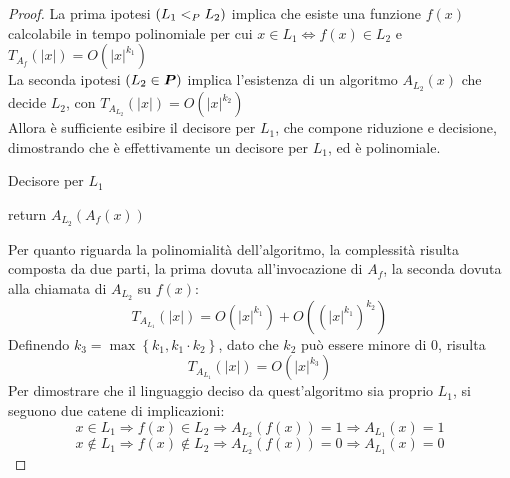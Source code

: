 \begin{proof}
    La prima ipotesi $( L_1 <_P L_2 )$ implica che esiste una funzione $f(x)$ calcolabile in tempo polinomiale per cui $x \in L_1 \Leftrightarrow f(x) \in L_2 $ e $ T_{A_{f}} (|x|) = O ( |x|^{k_1} ) $ \\
    La seconda ipotesi $ ( L_2 \in \bm{P} ) $ implica l'esistenza di un algoritmo $A_{L_{2}}(x)$ che decide $L_2$, con $ T_{A_{L_{2}}} (|x|) = O ( |x|^{k_2} ) $ \\
    Allora è sufficiente esibire il decisore per $L_1$, che compone riduzione e decisione, dimostrando che è effettivamente un decisore per $L_1$, ed è polinomiale.
\begin{algorithm}[H]
\caption{Decisore per $L_1$}\label{alg:decisorel1}
\begin{algorithmic}[1]
    \State return $A_{L_2}\left( A_{f} \left( x \right) \right)$
    \EndProcedure
\end{algorithmic}
\end{algorithm}
\noindent
    Per quanto riguarda la polinomialità dell'algoritmo, la complessità risulta composta da due parti, la prima dovuta all'invocazione di $A_f$, la seconda dovuta alla chiamata di $A_{L_2}$ su $f(x)$:
    \begin{equation*}
        T_{A_{L_{1}}}(|x|) = O \left( |x|^{k_1} \right) + O \left( \left( |x|^{k_1} \right)^{k_2} \right)
    \end{equation*}
    Definendo $k_3 = \max \left\{ k_1, k_1 \cdot k_2 \right\}$, dato che $k_2$ può essere minore di $0$, risulta
    \begin{equation*}
        T_{A_{L_{1}}}(|x|) = O \left( |x|^{k_3} \right) 
    \end{equation*}
    Per dimostrare che il linguaggio deciso da quest'algoritmo sia proprio $L_1$, si seguono due catene di implicazioni:
    \begin{equation*}
        x \in L_1 
        \Rightarrow
        f(x) \in L_2 
        \Rightarrow
        A_{L_2}\left( f(x) \right) = 1
        \Rightarrow
        A_{L_1} (x) = 1
    \end{equation*}
    \begin{equation*}
        x \notin L_1 
        \Rightarrow
        f(x) \notin L_2 
        \Rightarrow
        A_{L_2}\left( f(x) \right) = 0
        \Rightarrow
        A_{L_1} (x) = 0
    \end{equation*}
\end{proof}

